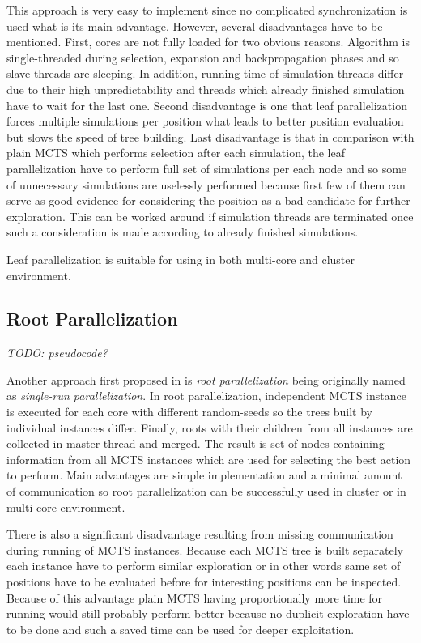 This approach is very easy to implement since no complicated synchronization is used
what is its main advantage. However, several disadvantages have to be mentioned. First, cores are
not fully loaded for two obvious reasons. Algorithm is single-threaded during selection, expansion
and backpropagation phases and so slave threads are sleeping. In addition, running time of
simulation threads differ due to their high unpredictability and threads which already finished
simulation have to wait for the last one. Second disadvantage is one that leaf parallelization
forces multiple simulations
per position what leads to better position evaluation but slows the speed of tree building. Last
disadvantage is that in comparison with plain MCTS which performs selection after each simulation,
the leaf parallelization have to perform full set of simulations per each node and so some of
unnecessary simulations are uselessly performed because first few of them can serve as good evidence
for considering the position as a bad candidate for further exploration. This can be worked around
if simulation threads are terminated once such a consideration is made according to already finished
simulations.

Leaf parallelization is suitable for using in both multi-core and cluster environment.


\subsection{Root Parallelization}

\emph{TODO: pseudocode?}

Another approach first proposed in \cite{Cazenave2007} is \emph{root parallelization} being
originally named as \emph{single-run parallelization}. In root parallelization, independent
MCTS instance is executed for each core with different random-seeds so the trees built by individual
instances differ. Finally, roots with their children from all instances are collected in master
thread and merged. The result is set of nodes containing information from all MCTS instances which
are used for selecting the best action to perform. Main advantages are simple implementation and a
minimal amount of communication so root parallelization can be successfully used in cluster
or in multi-core environment.

There is also a significant disadvantage resulting from missing communication during running of MCTS
instances. Because each MCTS tree is built separately each instance have to perform similar
exploration or in other words same set of positions have to be evaluated before for interesting
positions can be inspected. Because of this advantage plain MCTS having proportionally more time for
running would still probably perform better because no duplicit exploration have to be done and such
a saved time can be used for deeper exploitation.

